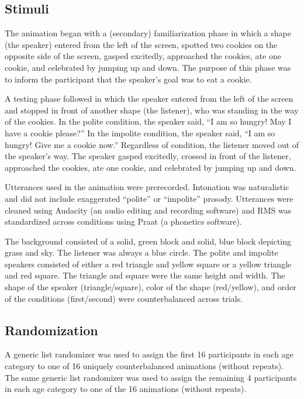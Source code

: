\documentclass[
  english,
  man,floatsintext]{apa6}
\begin{document}
\hypertarget{stimuli}{%
\subsection{Stimuli}\label{stimuli}}

The animation began with a (secondary) familiarization phase in which a shape (the speaker) entered from the left of the screen, spotted two cookies on the opposite side of the screen, gasped excitedly, approached the cookies, ate one cookie, and celebrated by jumping up and down. The purpose of this phase was to inform the participant that the speaker's goal was to eat a cookie.

A testing phase followed in which the speaker entered from the left of the screen and stopped in front of another shape (the listener), who was standing in the way of the cookies. In the polite condition, the speaker said, ``I am so hungry! May I have a cookie please?'' In the impolite condition, the speaker said, ``I am so hungry! Give me a cookie now.'' Regardless of condition, the listener moved out of the speaker's way. The speaker gasped excitedly, crossed in front of the listener, approached the cookies, ate one cookie, and celebrated by jumping up and down.

Utterances used in the animation were prerecorded. Intonation was naturalistic and did not include exaggerated ``polite'' or ``impolite'' prosody. Utterances were cleaned using Audacity (an audio editing and recording software) and RMS was standardized across conditions using Praat (a phonetics software).

The background consisted of a solid, green block and solid, blue block depicting grass and sky. The listener was always a blue circle. The polite and impolite speakers consisted of either a red triangle and yellow square or a yellow triangle and red square. The triangle and square were the same height and width. The shape of the speaker (triangle/square), color of the shape (red/yellow), and order of the conditions (first/second) were counterbalanced across trials.

\hypertarget{randomization}{%
\subsection{Randomization}\label{randomization}}

A generic list randomizer was used to assign the first 16 participants in each age category to one of 16 uniquely counterbalanced animations (without repeats). The same generic list randomizer was used to assign the remaining 4 participants in each age category to one of the 16 animations (without repeats).
\end{document}
